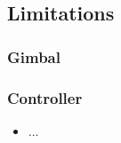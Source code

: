 \subsection{Limitations}

\begin{frame}
\frametitle{Gimbal}

  
\end{frame}


\begin{frame}
\frametitle{Controller}

  \begin{itemize}
    \item ...    
  \end{itemize}
    
\end{frame}